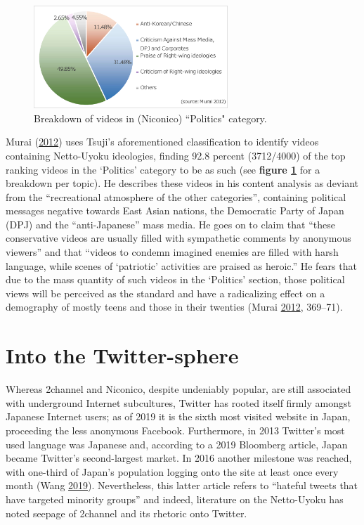 \documentclass[10pt,british,A4paper,oneside]{memoir}
\begin{document}
\begin{figure}[!htb]
 \centering
 \caption{\label{fig:murai-ratio} Breakdown of videos in (Niconico) ``Politics" category.}
 \includegraphics[width=0.65\textwidth,trim=4 4 4 4,clip]{images/murai-ratio2.eps}
\end{figure}

Murai (\protect\hyperlink{ref-murai_net_2012}{2012}) uses Tsuji's
aforementioned classification to identify videos containing Netto-Uyoku
ideologies, finding 92.8 percent (3712/4000) of the top ranking videos
in the `Politics' category to be as such (see \textbf{figure
\ref{fig:murai-ratio}} for a breakdown per topic). He describes these
videos in his content analysis as deviant from the ``recreational
atmosphere of the other categories'', containing political messages
negative towards East Asian nations, the Democratic Party of Japan (DPJ)
and the ``anti-Japanese'' mass media. He goes on to claim that ``these
conservative videos are usually filled with sympathetic comments by
anonymous viewers'' and that ``videos to condemn imagined enemies are
filled with harsh language, while scenes of `patriotic' activities are
praised as heroic.'' He fears that due to the mass quantity of such
videos in the `Politics' section, those political views will be
perceived as the standard and have a radicalizing effect on a demography
of mostly teens and those in their twenties (Murai
\protect\hyperlink{ref-murai_net_2012}{2012}, 369--71).

\section{Into the Twitter-sphere}\label{into-the-twitter-sphere}

Whereas 2channel and Niconico, despite undeniably popular, are still
associated with underground Internet subcultures, Twitter has rooted
itself firmly amongst Japanese Internet users; as of 2019 it is the
sixth most visited website in Japan, proceeding the less anonymous
Facebook. Furthermore, in 2013 Twitter's most used language was
Japanese and, according to a 2019 Bloomberg article, Japan became
Twitter's second-largest market. In 2016 another milestone was reached, with
one-third of Japan's population logging onto the site at least once
every month (Wang \protect\hyperlink{ref-wang_how_2019}{2019}).
Nevertheless, this latter article refers to ``hateful tweets that have
targeted minority groups'' and indeed, literature on the Netto-Uyoku has
noted seepage of 2channel and its rhetoric onto Twitter.
\end{document}
